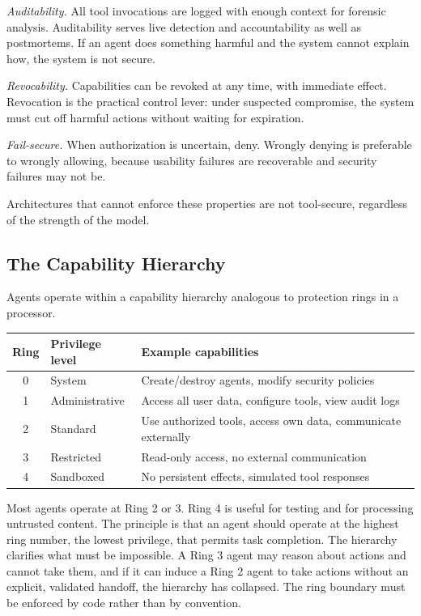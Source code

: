 \documentclass[11pt]{book}
\begin{document}
\textit{Auditability.} All tool invocations are logged with enough context for forensic analysis. Auditability serves live detection and accountability as well as postmortems. If an agent does something harmful and the system cannot explain how, the system is not secure.

\textit{Revocability.} Capabilities can be revoked at any time, with immediate effect. Revocation is the practical control lever: under suspected compromise, the system must cut off harmful actions without waiting for expiration.

\textit{Fail-secure.} When authorization is uncertain, deny. Wrongly denying is preferable to wrongly allowing, because usability failures are recoverable and security failures may not be.

Architectures that cannot enforce these properties are not tool-secure, regardless of the strength of the model.

\subsection{The Capability Hierarchy}

Agents operate within a capability hierarchy analogous to protection rings in a processor.

\begin{center}
\begin{tabular}{clp{6cm}}
\toprule
Ring & Privilege level & Example capabilities \\
\midrule
0 & System & Create/destroy agents, modify security policies \\
1 & Administrative & Access all user data, configure tools, view audit logs \\
2 & Standard & Use authorized tools, access own data, communicate externally \\
3 & Restricted & Read-only access, no external communication \\
4 & Sandboxed & No persistent effects, simulated tool responses \\
\bottomrule
\end{tabular}
\end{center}

Most agents operate at Ring 2 or 3. Ring 4 is useful for testing and for processing untrusted content. The principle is that an agent should operate at the highest ring number, the lowest privilege, that permits task completion. The hierarchy clarifies what must be impossible. A Ring 3 agent may reason about actions and cannot take them, and if it can induce a Ring 2 agent to take actions without an explicit, validated handoff, the hierarchy has collapsed. The ring boundary must be enforced by code rather than by convention.
\end{document}

